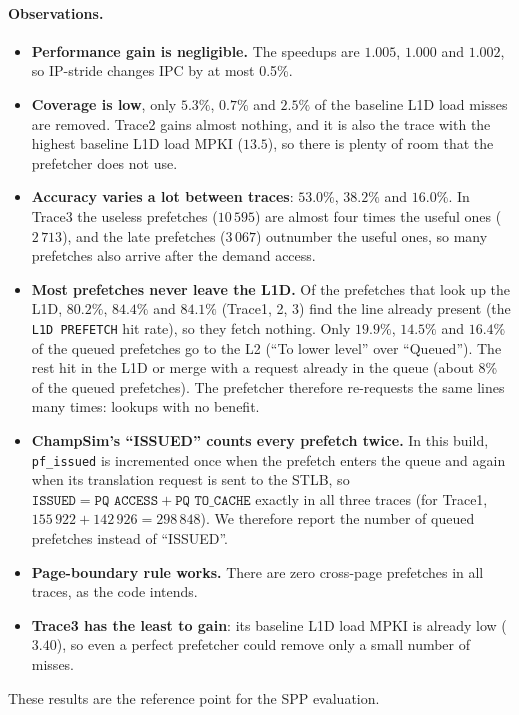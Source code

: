 \documentclass[11pt,a4paper]{article}
\begin{document}
\paragraph{Observations.}
\begin{itemize}
    \item \textbf{Performance gain is negligible.} The speedups are $1.005$, $1.000$ and $1.002$,
          so IP-stride changes IPC by at most 0.5\%.
    \item \textbf{Coverage is low}, only $5.3\%$, $0.7\%$ and $2.5\%$ of the baseline L1D load misses
          are removed. Trace2 gains almost nothing, and it is also the trace with the highest baseline
          L1D load MPKI ($13.5$), so there is plenty of room that the prefetcher does not use.
    \item \textbf{Accuracy varies a lot between traces}: $53.0\%$, $38.2\%$ and $16.0\%$. In Trace3
          the useless prefetches ($10\,595$) are almost four times the useful ones ($2\,713$), and the
          late prefetches ($3\,067$) outnumber the useful ones, so many prefetches also arrive after
          the demand access.
    \item \textbf{Most prefetches never leave the L1D.} Of the prefetches that look up the L1D, $80.2\%$,
          $84.4\%$ and $84.1\%$ (Trace1, 2, 3) find the line already present (the \texttt{L1D PREFETCH}
          hit rate), so they fetch nothing. Only $19.9\%$, $14.5\%$ and $16.4\%$ of the queued
          prefetches go to the L2 (``To lower level'' over ``Queued''). The rest hit in the L1D or
          merge with a request already in the queue (about 8\% of the queued prefetches). The
          prefetcher therefore re-requests the same lines many times: lookups with no benefit.
    \item \textbf{ChampSim's ``ISSUED'' counts every prefetch twice.} In this build, \texttt{pf\_issued}
          is incremented once when the prefetch enters the queue and again when its translation
          request is sent to the STLB, so $\texttt{ISSUED} = \texttt{PQ ACCESS} + \texttt{PQ TO\_CACHE}$
          exactly in all three traces (for Trace1, $155\,922 + 142\,926 = 298\,848$). We therefore
          report the number of queued prefetches instead of ``ISSUED''.
    \item \textbf{Page-boundary rule works.} There are zero cross-page prefetches in all traces,
          as the code intends.
    \item \textbf{Trace3 has the least to gain}: its baseline L1D load MPKI is already low ($3.40$),
          so even a perfect prefetcher could remove only a small number of misses.
\end{itemize}
These results are the reference point for the SPP evaluation. 
\end{document}
